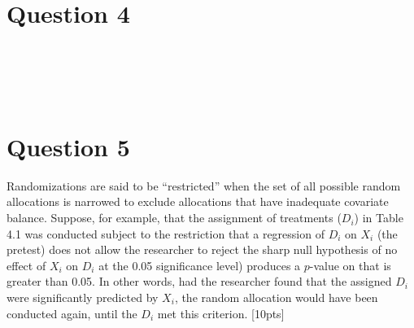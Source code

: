 \documentclass[11pt,notitlepage]{article}\usepackage[]{graphicx}\usepackage[]{color}
\makeatletter
\newenvironment{kframe}{%
 \def\at@end@of@kframe{}%
 \ifinner\ifhmode%
  \def\at@end@of@kframe{\end{minipage}}%
  \begin{minipage}{\columnwidth}%
 \fi\fi%
 \def\FrameCommand##1{\hskip\@totalleftmargin \hskip-\fboxsep
 \colorbox{shadecolor}{##1}\hskip-\fboxsep
     \hskip-\linewidth \hskip-\@totalleftmargin \hskip\columnwidth}%
 \MakeFramed {\advance\hsize-\width
   \@totalleftmargin\z@ \linewidth\hsize
   \@setminipage}}%
 {\par\unskip\endMakeFramed%
 \at@end@of@kframe}
\newenvironment{knitrout}{}{} %
\makeatother
\begin{document}
\section*{Question 4}

\begin{knitrout}
\color{fgcolor}\begin{kframe}
\begin{verbatim}





\end{verbatim}
\end{kframe}
\end{knitrout}

\section*{Question 5}


Randomizations are said to be ``restricted'' when the set of all possible random allocations is narrowed to exclude allocations that have inadequate covariate balance.  Suppose, for example, that the assignment of treatments ($D_i$) in Table 4.1 was conducted subject to the restriction that a regression of $D_i$ on $X_i$ (the pretest) does not allow the researcher to reject the sharp null hypothesis of no effect of $X_i$ on $D_i$ at the 0.05 significance level) produces a $p$-value on that is greater than 0.05. In other words, had the researcher found that the assigned $D_i$ were significantly predicted by $X_i$, the random allocation would have been conducted again, until the $D_i$ met this criterion. [10pts]
\end{document}
